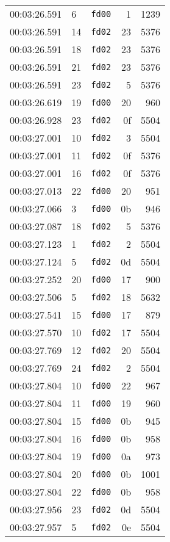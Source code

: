 \documentclass{article}
\begin{document}
\begin{longtable}{lllrr}
00:03:26.591 & 6 & \texttt{fd00} & 1 & 1239 \\
00:03:26.591 & 14 & \texttt{fd02} & 23 & 5376 \\
00:03:26.591 & 18 & \texttt{fd02} & 23 & 5376 \\
00:03:26.591 & 21 & \texttt{fd02} & 23 & 5376 \\
00:03:26.591 & 23 & \texttt{fd02} & 5 & 5376 \\
00:03:26.619 & 19 & \texttt{fd00} & 20 & 960 \\
00:03:26.928 & 23 & \texttt{fd02} & 0f & 5504 \\
00:03:27.001 & 10 & \texttt{fd02} & 3 & 5504 \\
00:03:27.001 & 11 & \texttt{fd02} & 0f & 5376 \\
00:03:27.001 & 16 & \texttt{fd02} & 0f & 5376 \\
00:03:27.013 & 22 & \texttt{fd00} & 20 & 951 \\
00:03:27.066 & 3 & \texttt{fd00} & 0b & 946 \\
00:03:27.087 & 18 & \texttt{fd02} & 5 & 5376 \\
00:03:27.123 & 1 & \texttt{fd02} & 2 & 5504 \\
00:03:27.124 & 5 & \texttt{fd02} & 0d & 5504 \\
00:03:27.252 & 20 & \texttt{fd00} & 17 & 900 \\
00:03:27.506 & 5 & \texttt{fd02} & 18 & 5632 \\
00:03:27.541 & 15 & \texttt{fd00} & 17 & 879 \\
00:03:27.570 & 10 & \texttt{fd02} & 17 & 5504 \\
00:03:27.769 & 12 & \texttt{fd02} & 20 & 5504 \\
00:03:27.769 & 24 & \texttt{fd02} & 2 & 5504 \\
00:03:27.804 & 10 & \texttt{fd00} & 22 & 967 \\
00:03:27.804 & 11 & \texttt{fd00} & 19 & 960 \\
00:03:27.804 & 15 & \texttt{fd00} & 0b & 945 \\
00:03:27.804 & 16 & \texttt{fd00} & 0b & 958 \\
00:03:27.804 & 19 & \texttt{fd00} & 0a & 973 \\
00:03:27.804 & 20 & \texttt{fd00} & 0b & 1001 \\
00:03:27.804 & 22 & \texttt{fd00} & 0b & 958 \\
00:03:27.956 & 23 & \texttt{fd02} & 0d & 5504 \\
00:03:27.957 & 5 & \texttt{fd02} & 0e & 5504 \\

\end{longtable}
\end{document}
